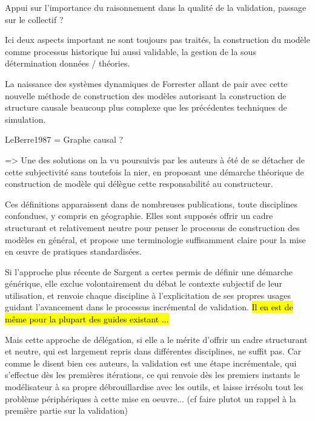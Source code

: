 Appui sur l'importance du raisonnement dans la qualité de la validation, passage sur le collectif ?

Ici deux aspects important ne sont toujours pas traités, la construction du modèle comme processus historique lui aussi validable, la gestion de la sous détermination données / théories.


La naissance des systèmes dynamiques de Forrester allant de pair avec cette nouvelle méthode de construction des modèles autorisant la construction de structure causale beaucoup plus complexe que les précédentes techniques de simulation.

LeBerre1987 = Graphe causal ?



=> Une des solutions on la vu poursuivis par les auteurs à été de se détacher de cette subjectivité sans toutefois la nier, en proposant une démarche théorique de construction de modèle qui délègue cette responsabilité au constructeur.



Ces définitions apparaissent dans de nombreuses publications, toute disciplines confondues, y compris en géographie. Elles sont supposés offrir un cadre structurant et relativement neutre pour penser le processus de construction des modèles en général, et propose une terminologie suffisamment claire pour la mise en œuvre de pratiques standardisées.

Si l'approche plus récente de Sargent a certes permis de définir une démarche générique, elle exclue volontairement du débat le contexte subjectif de leur utilisation, et renvoie chaque discipline à l'explicitation de ses propres usages guidant l'avancement dans le processus incrémental de validation. \hl{Il en est de même pour la plupart des guides existant ...}

Mais cette approche de délégation, si elle a le mérite d'offrir un cadre structurant et neutre, qui est largement repris dans différentes disciplines, ne suffit pas. Car comme le disent bien ces auteurs, la validation est une étape incrémentale, qui s'effectue dès les premières itérations, ce qui renvoie dès les premiers instants le modélisateur à sa propre débrouillardise avec les outils, et laisse irrésolu tout les problème périphériques à cette mise en oeuvre... (cf faire plutot un rappel à la première partie sur la validation)


